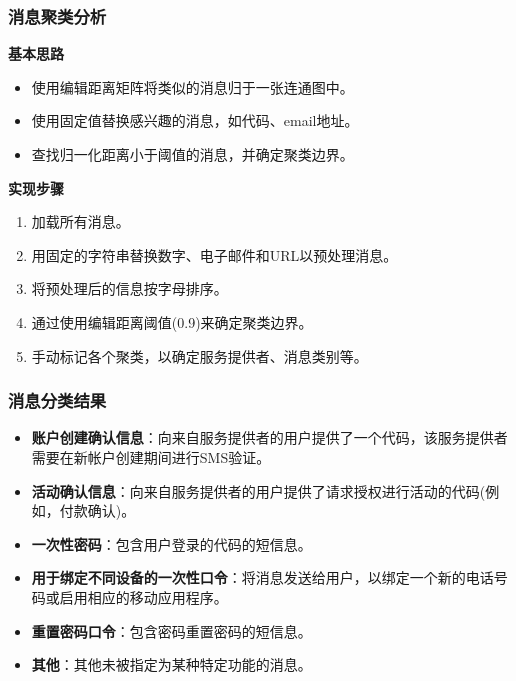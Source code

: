 \documentclass[10pt,aspectratio=43,mathserif]{beamer}
\begin{document}
\begin{frame}
    \frametitle{\textbf{消息聚类分析}}
    \begin{block}{\textbf{基本思路}}
        \begin{itemize}
            \item 使用编辑距离矩阵将类似的消息归于一张连通图中。
            \item 使用固定值替换感兴趣的消息，如代码、email地址。
            \item 查找归一化距离小于阈值的消息，并确定聚类边界。
        \end{itemize}
    \end{block}

    \begin{block}{\textbf{实现步骤}}
        \begin{enumerate}
            \item 加载所有消息。
            \item 用固定的字符串替换数字、电子邮件和URL以预处理消息。
            \item 将预处理后的信息按字母排序。
            \item 通过使用编辑距离阈值(0.9)来确定聚类边界。
            \item 手动标记各个聚类，以确定服务提供者、消息类别等。
        \end{enumerate}
    \end{block}
\end{frame}

\begin{frame}
    \frametitle{\textbf{消息分类结果}}
    \begin{itemize}
        \item \textbf{账户创建确认信息}：向来自服务提供者的用户提供了一个代码，该服务提供者需要在新帐户创建期间进行SMS验证。
        \item \textbf{活动确认信息}：向来自服务提供者的用户提供了请求授权进行活动的代码(例如，付款确认)。
        \item \textbf{一次性密码}：包含用户登录的代码的短信息。
        \item \textbf{用于绑定不同设备的一次性口令}：将消息发送给用户，以绑定一个新的电话号码或启用相应的移动应用程序。
        \item \textbf{重置密码口令}：包含密码重置密码的短信息。
        \item \textbf{其他}：其他未被指定为某种特定功能的消息。
    \end{itemize}
\end{frame}
\end{document}
